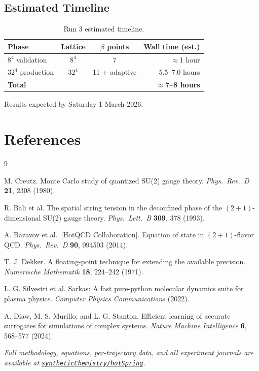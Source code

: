 \documentclass[11pt,a4paper]{article}
\newcommand{\repo}{\href{https://github.com/syntheticChemistry/hotSpring}%
                        {\texttt{syntheticChemistry/hotSpring}}}
\begin{document}
\subsection{Estimated Timeline}

\begin{table}[H]
\centering
\caption{Run 3 estimated timeline.}
\label{tab:timeline}
\renewcommand{\arraystretch}{1.25}
\begin{tabular}{lccr}
\toprule
Phase & Lattice & $\beta$ points & Wall time (est.) \\
\midrule
$8^4$ validation  & $8^4$   & 7               & $\approx$1 hour \\
$32^4$ production & $32^4$  & 11 + adaptive   & 5.5--7.0 hours \\
\textbf{Total}    &         &                 & \textbf{$\approx$7--8 hours} \\
\bottomrule
\end{tabular}
\end{table}

Results expected by Saturday 1 March 2026.

\FloatBarrier
\section*{References}

\begin{thebibliography}{9}

M. Creutz.
\newblock Monte Carlo study of quantized SU(2) gauge theory.
\newblock \textit{Phys.\ Rev.\ D} \textbf{21}, 2308 (1980).

R. Bali et al.
\newblock The spatial string tension in the deconfined phase of the
  $(2{+}1)$-dimensional SU(2) gauge theory.
\newblock \textit{Phys.\ Lett.\ B} \textbf{309}, 378 (1993).

A. Bazavov et al.\ [HotQCD Collaboration].
\newblock Equation of state in $(2{+}1)$-flavor QCD.
\newblock \textit{Phys.\ Rev.\ D} \textbf{90}, 094503 (2014).

T. J. Dekker.
\newblock A floating-point technique for extending the available precision.
\newblock \textit{Numerische Mathematik} \textbf{18}, 224--242 (1971).

L. G. Silvestri et al.
\newblock Sarkas: A fast pure-python molecular dynamics suite for plasma
  physics.
\newblock \textit{Computer Physics Communications} (2022).

A. Diaw, M. S. Murillo, and L. G. Stanton.
\newblock Efficient learning of accurate surrogates for simulations of complex
  systems.
\newblock \textit{Nature Machine Intelligence} \textbf{6}, 568--577 (2024).

\end{thebibliography}

\bigskip\noindent
\textit{Full methodology, equations, per-trajectory data, and all experiment
journals are available at \repo.}
\end{document}
